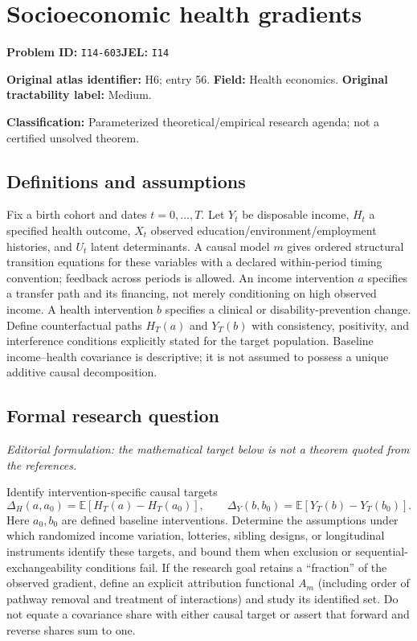 \documentclass[11pt,a4paper]{article}
\begin{document}
\section*{Socioeconomic health gradients}
\textbf{Problem ID:} \texttt{I14-603}\quad \textbf{JEL:} \texttt{I14}\par
\label{problem:OP-0056}
\label{atlas:prob:H6}
\noindent\textbf{Original atlas identifier:} H6; entry 56. \textbf{Field:} Health economics. \textbf{Original tractability label:} Medium.

\noindent\textbf{Classification:} Parameterized theoretical/empirical research agenda; not a certified unsolved theorem.

\subsection*{Definitions and assumptions}
Fix a birth cohort and dates $t=0,\ldots,T$. Let $Y_t$ be disposable income, $H_t$ a specified health outcome, $X_t$ observed education/environment/employment histories, and $U_t$ latent determinants. A causal model $m$ gives ordered structural transition equations for these variables with a declared within-period timing convention; feedback across periods is allowed. An income intervention $a$ specifies a transfer path and its financing, not merely conditioning on high observed income. A health intervention $b$ specifies a clinical or disability-prevention change. Define counterfactual paths $H_T(a)$ and $Y_T(b)$ with consistency, positivity, and interference conditions explicitly stated for the target population. Baseline income--health covariance is descriptive; it is not assumed to possess a unique additive causal decomposition.

\subsection*{Formal research question}
\emph{Editorial formulation: the mathematical target below is not a theorem quoted from the references.}

Identify intervention-specific causal targets
\[
 \Delta_H(a,a_0)=\mathbb E[H_T(a)-H_T(a_0)],\qquad
 \Delta_Y(b,b_0)=\mathbb E[Y_T(b)-Y_T(b_0)].
\]
Here $a_0,b_0$ are defined baseline interventions. Determine the assumptions under which randomized income variation, lotteries, sibling designs, or longitudinal instruments identify these targets, and bound them when exclusion or sequential-exchangeability conditions fail. If the research goal retains a “fraction” of the observed gradient, define an explicit attribution functional $A_m$ (including order of pathway removal and treatment of interactions) and study its identified set. Do not equate a covariance share with either causal target or assert that forward and reverse shares sum to one.
\end{document}
